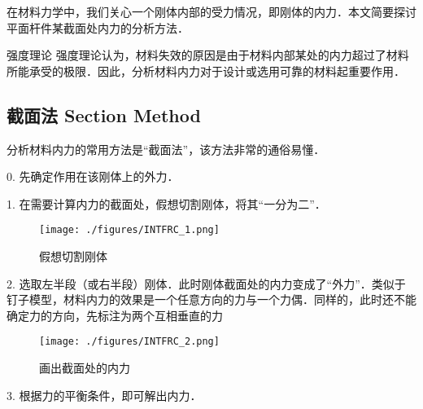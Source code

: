 在材料力学中，我们关心一个刚体内部的受力情况，即刚体的内力．本文简要探讨平面杆件某截面处内力的分析方法．

\begin{example}{强度理论}
强度理论认为，材料失效的原因是由于材料内部某处的内力超过了材料所能承受的极限．因此，分析材料内力对于设计或选用可靠的材料起重要作用．
\end{example}

\subsection{截面法 Section Method}
分析材料内力的常用方法是“截面法”，该方法非常的通俗易懂．

0. 先确定作用在该刚体上的外力．

1. 在需要计算内力的截面处，假想切割刚体，将其“一分为二”．
\begin{figure}[ht]
\centering
\texttt{[image: ./figures/INTFRC\_1.png]}
\caption{假想切割刚体} \label{INTFRC_fig1}
\end{figure}

2. 选取左半段（或右半段）刚体．此时刚体截面处的内力变成了“外力”．类似于钉子模型，材料内力的效果是一个任意方向的力与一个力偶．同样的，此时还不能确定力的方向，先标注为两个互相垂直的力
\begin{figure}[ht]
\centering
\texttt{[image: ./figures/INTFRC\_2.png]}
\caption{画出截面处的内力} \label{INTFRC_fig2}
\end{figure}

3. 根据力的平衡条件，即可解出内力．
